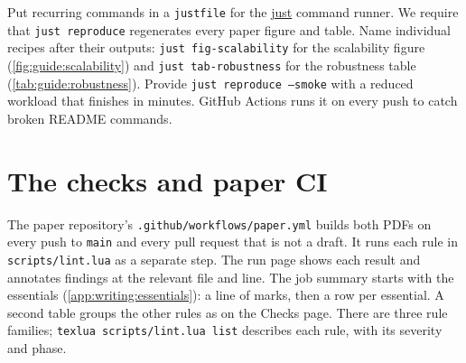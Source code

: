Put recurring commands in a \texttt{justfile} for the \href{https://github.com/casey/just}{just} command runner. We require that \texttt{just reproduce} regenerates every paper figure and table. Name individual recipes after their outputs: \texttt{just fig-scalability} for the scalability figure (\cref{fig:guide:scalability}) and \texttt{just tab-robustness} for the robustness table (\cref{tab:guide:robustness}). Provide \texttt{just reproduce --smoke} with a reduced workload that finishes in minutes. GitHub Actions runs it on every push to catch broken README commands.

\section{The checks and paper CI}\label{app:code:paperci}
The paper repository's \texttt{.github/workflows/paper.yml} builds both PDFs on every push to \texttt{main} and every pull request that is not a draft. It runs each rule in \texttt{scripts/lint.lua} as a separate step. The run page shows each result and annotates findings at the relevant file and line. The job summary starts with the essentials (\cref{app:writing:essentials}): a line of marks, then a row per essential. A second table groups the other rules as on the Checks page. There are three rule families; \texttt{texlua scripts/lint.lua list} describes each rule, with its severity and phase.
